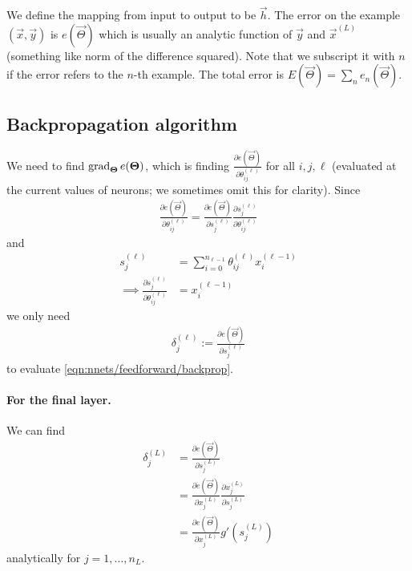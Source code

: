 We define the mapping from input to output to be $\vec h$. The error on the example $(\vec x, \vec y)$ is $e(\vec \Theta)$ which is usually an analytic function of $\vec y$ and $\vec x^{(L)}$ (something like norm of the difference squared). Note that we subscript it with $n$ if the error refers to the $n$-th example. The total error is $E(\vec \Theta) = \sum_n e_n(\vec \Theta)$.

\subsection{Backpropagation algorithm}
We need to find $\operatorname{\mathrm{grad}}_{\boldsymbol{\mathbf{\Theta}}} e(\boldsymbol{\mathbf{\Theta}})$, which is finding $\frac{\partial e(\vec \Theta)}{\partial \theta_{ij}^{(\ell)}}$ for all $i, j, \ell$ (evaluated at the current values of neurons; we sometimes omit this for clarity). Since
\begin{align}
    \frac{\partial e(\vec \Theta)}{\partial \theta_{ij}^{(\ell)}} = \frac{\partial e(\vec \Theta)}{\partial s_j^{(\ell)}} \frac{\partial s_j^{(\ell)}}{\partial \theta_{ij}^{(\ell)}} \label{eqn:nnets/feedforward/backprop}
\end{align}
and
\begin{align}
                s_j^{(\ell)}                                                &= \sum_{i = 0}^{n_{\ell - 1}} \theta_{ij}^{(\ell)} x_i^{(\ell - 1)} \\
    \implies    \frac{\partial s_j^{(\ell)}}{\partial \theta_{ij}^{(\ell)}} &= x_i^{(\ell - 1)}
\end{align}
we only need
\begin{align}
    \delta_j^{(\ell)} := \frac{\partial e(\vec \Theta)}{\partial s_j^{(\ell)}}
\end{align}
to evaluate \eqref{eqn:nnets/feedforward/backprop}.

\paragraph{For the final layer.} We can find
\begin{align}
    \delta_j^{(L)}  &= \frac{\partial e(\vec \Theta)}{\partial s_j^{(L)}} \\
                    &= \frac{\partial e(\vec \Theta)}{\partial x_j^{(L)}} \frac{\partial x_j^{(L)}}{\partial s_j^{(L)}} \\
                    &= \frac{\partial e(\vec \Theta)}{\partial x_j^{(L)}} g'\left(s_j^{(L)}\right) \label{eqn:nnets/feedforward/delta-last}
\end{align}
analytically for $j = 1, \dotsc, n_L$.

